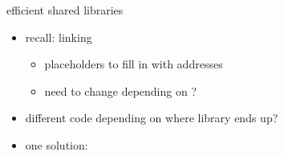 
\begin{frame}{efficient shared libraries}
\begin{itemize}
\item recall: linking
\begin{itemize}
    \item placeholders to fill in with addresses
    \item need to change depending on ?
\end{itemize}
\item different code depending on where library ends up?
\item one solution: 
\end{itemize}
\end{frame}

